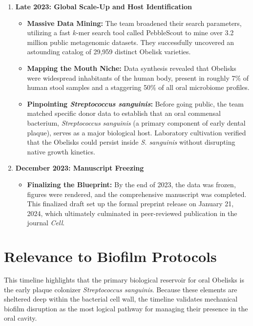 \documentclass[11pt,a4paper]{article}
\begin{document}
\begin{enumerate}[leftmargin=*, itemsep=1.2em]
    \item \textbf{Late 2023: Global Scale-Up and Host Identification}
    \begin{itemize}[itemsep=0.3em]
        \item \textbf{Massive Data Mining:} The team broadened their search parameters, utilizing a fast $k$-mer search tool called PebbleScout to mine over 3.2 million public metagenomic datasets. They successfully uncovered an astounding catalog of 29,959 distinct Obelisk varieties.
        \item \textbf{Mapping the Mouth Niche:} Data synthesis revealed that Obelisks were widespread inhabitants of the human body, present in roughly 7\% of human stool samples and a staggering 50\% of all oral microbiome profiles.
        \item \textbf{Pinpointing \textit{Streptococcus sanguinis}:} Before going public, the team matched specific donor data to establish that an oral commensal bacterium, \textit{Streptococcus sanguinis} (a primary component of early dental plaque), serves as a major biological host. Laboratory cultivation verified that the Obelisks could persist inside \textit{S. sanguinis} without disrupting native growth kinetics.
    \end{itemize}

    \item \textbf{December 2023: Manuscript Freezing}
    \begin{itemize}[itemsep=0.3em]
        \item \textbf{Finalizing the Blueprint:} By the end of 2023, the data was frozen, figures were rendered, and the comprehensive manuscript was completed. This finalized draft set up the formal preprint release on January 21, 2024, which ultimately culminated in peer-reviewed publication in the journal \textit{Cell}.
    \end{itemize}
\end{enumerate}

\section*{Relevance to Biofilm Protocols}
This timeline highlights that the primary biological reservoir for oral Obelisks is the early plaque colonizer \textit{Streptococcus sanguinis}. Because these elements are sheltered deep within the bacterial cell wall, the timeline validates mechanical biofilm disruption as the most logical pathway for managing their presence in the oral cavity.
\end{document}
